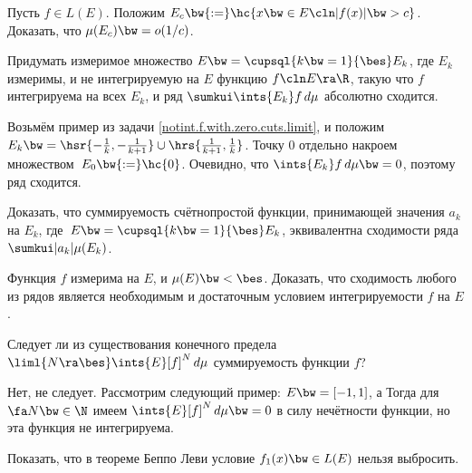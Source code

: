\documentclass[a4paper]{article}
\begin{document}
\begin{problem}
  Пусть $f \in L(E)$. Положим
  $E_c \bw{:=} \hc{x \bw\in E\cln |f(x)| \bw> c}$.
  Доказать, что $\mu(E_c) \bw= o(1/c)$.
\end{problem}

\begin{problem}
  Придумать измеримое множество $E \bw= \cupsql{k\bw=1}{\bes} E_k$, где $E_k$ измеримы, и
  не интегрируемую на $E$ функцию $f\cln E \ra \R$, такую что $f$ интегрируема на всех $E_k$, и ряд
  $\sumkui \ints{E_k} f\,d\mu$ абсолютно сходится.
\end{problem}
\begin{solution}
  Возьмём пример из задачи \ref{notint.f.with.zero.cuts.limit}, и положим
  $E_k \bw= \hsr{-\frac1k, -\frac1{k+1}} \cup \hrs{\frac1{k+1}, \frac1k}$. Точку $0$ отдельно
  накроем множеством~$E_0 \bw{:=} \hc{0}$. Очевидно, что $\ints{E_k} f\,d\mu \bw= 0$, поэтому
  ряд сходится.
\end{solution}

\begin{problem}
  Доказать, что суммируемость счётно\д простой функции, принимающей значения $a_k$ на $E_k$,
  где~$E \bw= \cupsql{k\bw=1}{\bes} E_k$, эквивалентна сходимости ряда $\sumkui |a_k| \mu(E_k)$.
\end{problem}

\begin{problem}
  Функция $f$ измерима на $E$, и $\mu(E) \bw< \bes$. Доказать, что сходимость любого из рядов
  является необходимым и достаточным условием интегрируемости $f$ на $E$.
\end{problem}

\begin{problem}\label{notint.f.with.zero.cuts.limit}
  Следует ли из существования конечного предела $\liml{N \ra \bes} \ints{E}[f]^N\,d\mu$
  суммируемость функции $f$?
\end{problem}
\begin{solution}
  Нет, не следует. Рассмотрим следующий пример: $E \bw= [-1,1]$, а
  Тогда для $\fa N \bw\in \N$ имеем $\ints{E} [f]^N\, d\mu \bw= 0$ в силу нечётности функции,
  но эта функция не интегрируема.
\end{solution}

\begin{problem}
  Показать, что в теореме Беппо Леви условие $f_1(x) \bw\in L(E)$ нельзя выбросить.
\end{problem}
\end{document}
